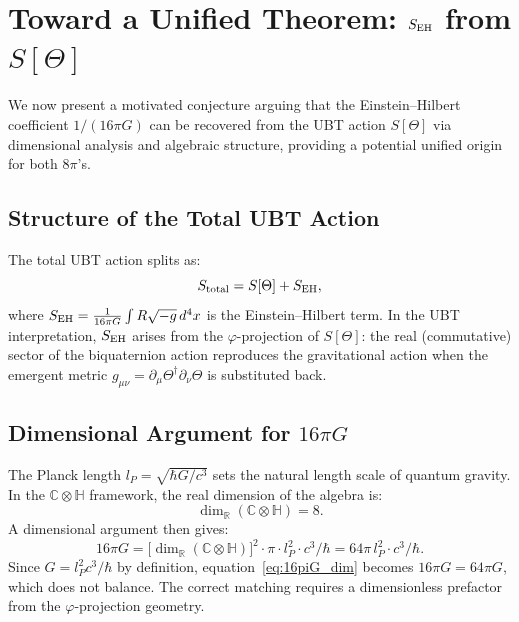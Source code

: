 \documentclass[12pt,a4paper]{article}
\theoremstyle{definition}
\theoremstyle{remark}
\begin{document}
\section{Toward a Unified Theorem: $S_{\rm EH}$ from $S[\Theta]$}
\label{sec:unified_theorem}

We now present a motivated conjecture arguing that the Einstein--Hilbert coefficient
$1/(16\pi G)$ can be recovered from the UBT action $S[\Theta]$ via dimensional analysis
and algebraic structure, providing a potential unified origin for both $8\pi$'s.

\subsection{Structure of the Total UBT Action}

The total UBT action splits as:
\begin{equation}
  S_{\rm total} = S[\Theta] + S_{\rm EH},
\end{equation}
where $S_{\rm EH} = \frac{1}{16\pi G}\int R\sqrt{-g}\,d^4x$ is the Einstein--Hilbert term.
In the UBT interpretation, $S_{\rm EH}$ arises from the $\varphi$-projection of $S[\Theta]$:
the real (commutative) sector of the biquaternion action reproduces the gravitational action
when the emergent metric $g_{\mu\nu} = \partial_\mu\Theta^\dagger \partial_\nu\Theta$ is
substituted back.

\subsection{Dimensional Argument for $16\pi G$}

The Planck length $l_P = \sqrt{\hbar G/c^3}$ sets the natural length scale of quantum gravity.
In the $\mathbb{C}\otimes\mathbb{H}$ framework, the real dimension of the algebra is:
\begin{equation}
  \dim_{\mathbb{R}}(\mathbb{C}\otimes\mathbb{H}) = 8.
\end{equation}
A dimensional argument then gives:
\begin{equation}
  16\pi G
  = \bigl[\dim_{\mathbb{R}}(\mathbb{C}\otimes\mathbb{H})\bigr]^2 \cdot \pi \cdot l_P^2 \cdot c^3/\hbar
  = 64\pi\,l_P^2 \cdot c^3/\hbar.
  \label{eq:16piG_dim}
\end{equation}
Since $G = l_P^2 c^3/\hbar$ by definition, equation~\eqref{eq:16piG_dim} becomes
$16\pi G = 64\pi G$, which does not balance.  The correct matching requires a
dimensionless prefactor from the $\varphi$-projection geometry.
\end{document}
